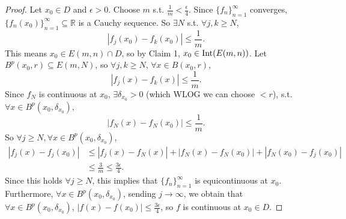 \begin{proof}
    \noindent Let $x_0 \in D$ and $\epsilon > 0$. Choose $m$ s.t. $\frac{1}{m} < \frac{\epsilon}{4}$. 
    Since $\{f_{n}\}_{n=1}^{\infty}$ converges, $\{f_{n}(x_0)\}_{n=1}^{\infty} \subseteq \mathbb{R}$ 
    is a Cauchy sequence. So $\exists N$ s.t. $\forall j, k \geq N$,
    \[
        \left| f_j(x_0) - f_k(x_0) \right| \leq \frac{1}{m}.
    \]
    This means $x_0 \in E(m, n) \cap D$, so by Claim 1, $x_0 \in \operatorname{Int}(E(m ,n))$. 
    Let $B^p(x_0, r) \subseteq E(m ,N)$, so $\forall j, k \geq N$, $\forall x \in B(x_0 , r)$,
    \[
        \left| f_j(x) - f_k(x) \right| \leq \frac{1}{m}.
    \]
    Since $f_N$ is continuous at $x_0$, $\exists \delta_{x_0} > 0$ 
    (which WLOG we can choose $< r$), s.t. $\forall x \in B^p(x_0, \delta_{x_0})$,
    \[
        \left| f_N(x) - f_N(x_0) \right| \leq \frac{1}{m}.
    \]
    So $\forall j \geq N, \forall x \in B^p(x_0, \delta_{x_0})$,
    \begin{align*}
        \left| f_j(x) - f_j(x_0) \right| &\leq \left| f_j(x) - f_N(x) \right| + 
        \left| f_N(x) - f_N(x_0) \right| + \left| f_N(x_0) - f_j(x_0) \right| \\ &\leq \frac{3}{m} 
        \leq \frac{3\epsilon}{4}.
    \end{align*}
    Since this holds $\forall j \geq N$, this implies that $\{f_{n}\}_{n=1}^{\infty}$ is 
    equicontinuous at $x_0$. Furthermore, $\forall x \in B^p(x_0, \delta_{x_0})$, 
    sending $j \to \infty$, we obtain that $\forall x \in B^p(x_0, \delta_{x_0})$, 
    \newline $\left| f(x) - f(x_0) \right| \leq \frac{3\epsilon}{4}$, so $f$ is continuous at 
    $x_0 \in D$.
\end{proof}



